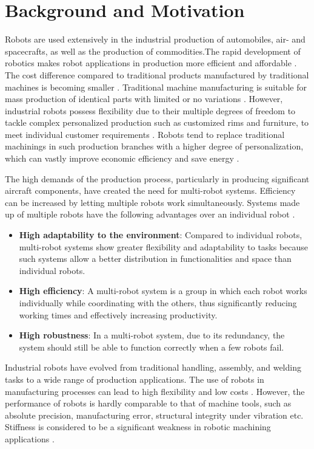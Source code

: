 \section{Background and Motivation} \label{sec:Introduction:Background}
Robots are used extensively in the industrial production of automobiles, air- and spacecrafts, as well as the production of commodities.The rapid development of robotics makes robot applications in production more efficient and affordable \cite{EEUIR}. The cost difference compared to traditional products manufactured by traditional machines is becoming smaller \cite{IAP}. Traditional machine manufacturing is suitable for mass production of identical parts with limited or no variations \cite{IAP}. However, industrial robots possess flexibility due to their multiple degrees of freedom to tackle complex personalized production such as customized rims and furniture, to meet individual customer requirements \cite{IAP}. Robots tend to replace traditional machinings in such production branches with a higher degree of personalization, which can vastly improve economic efficiency and save energy \cite{EEUIR}.\par
The high demands of the production process, particularly in producing significant aircraft components, have created the need for multi-robot systems. Efficiency can be increased by letting multiple robots work simultaneously. Systems made up of multiple robots have the following advantages over an individual robot \cite{PFRCD} \cite{KMR}.
\begin{itemize}
 \item \textbf{High adaptability to the environment}: Compared to individual robots, multi-robot systems show greater flexibility and adaptability to tasks because such systems allow a better distribution in functionalities and space than individual robots.
 \item \textbf{High efficiency}: A multi-robot system is a group in which each robot works individually while coordinating with the others, thus significantly reducing working times and effectively increasing productivity.
 \item \textbf{High robustness}: In a multi-robot system, due to its redundancy, the system should still be able to function correctly when a few robots fail.
\end{itemize}
Industrial robots have evolved from traditional handling, assembly, and welding tasks to a wide range of production applications. The use of robots in manufacturing processes can lead to high flexibility and low costs \cite{IAP}. However, the performance of robots is hardly comparable to that of machine tools, such as absolute precision, manufacturing error, structural integrity under vibration etc. Stiffness is considered to be a significant weakness in robotic machining applications \cite{MIIR}.\par
